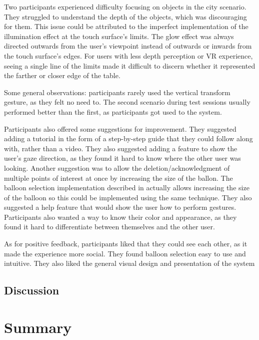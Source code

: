         Two participants experienced difficulty focusing on objects in the city scenario. They struggled to understand the depth of the objects, which was discouraging for them. This issue could be attributed to the imperfect implementation of the illumination effect at the touch surface's limits. The glow effect was always directed outwards from the user's viewpoint instead of outwards or inwards from the touch surface's edges. For users with less depth perception or VR experience, seeing a single line of the limits made it difficult to discern whether it represented the farther or closer edge of the table.

        Some general observations: participants rarely used the vertical transform gesture, as they felt no need to. The second scenario during test sessions usually performed better than the first, as participants got used to the system.

        Participants also offered some suggestions for improvement. They suggested adding a tutorial in the form of a step-by-step guide that they could follow along with, rather than a video. They also suggested adding a feature to show the user's gaze direction, as they found it hard to know where the other user was looking. Another suggestion was to allow the deletion/acknowledgment of multiple points of interest at once by increasing the size of the ballon. The balloon selection implementation described in \cite{benkoBalloonSelectionMultiFinger2007} actually allows increasing the size of the balloon so this could be implemented using the same technique. They also suggested a help feature that would show the user how to perform gestures. Participants also wanted a way to know their color and appearance, as they found it hard to differentiate between themselves and the other user.

        As for positive feedback, participants liked that they could see each other, as it made the experience more social. They found balloon selection easy to use and intuitive. They also liked the general visual design and presentation of the system

    \subsection{Discussion}


    \section{Summary}
